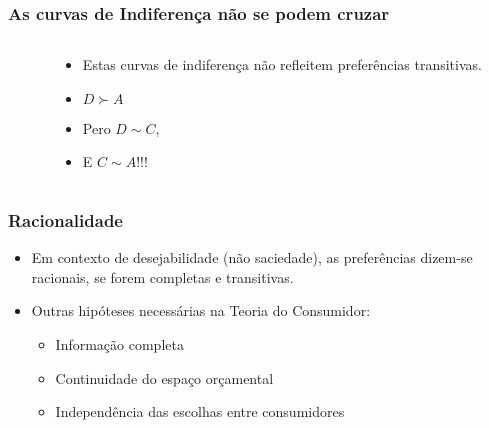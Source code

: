\begin{frame}
	\frametitle{As curvas de Indiferen\c ca n\~ao se podem cruzar}
	\begin{columns}
		\begin{column}{0.47\textwidth}
			\begin{center}
				\def\a{1/2}
				\def\inter{1.365}
			\end{center}
		\end{column}
		\begin{column}{0.47\textwidth}
			\begin{itemize}
				\item Estas curvas de indiferen\c ca n\~ao refleitem prefer\^encias transitivas.
				\item<2-> $D\succ A$
				\item<3-> Pero $D\sim C$,
				\item<4-> E $C\sim A$!!!
			\end{itemize}
		\end{column}
	\end{columns}
\end{frame}

\begin{frame}
	\frametitle{Racionalidade}
	\begin{itemize}
		\item<1-> Em contexto de desejabilidade (n\~ao saciedade), as prefer\^encias dizem-se racionais, se forem completas e transitivas.
		\item<2-> Outras hip\'oteses necess\'arias na Teoria do Consumidor:
		\begin{itemize}
			\item<3-> Informa\c c\~ao completa
			\item<4-> Continuidade do espa\c co or\c camental
			\item<5-> Independ\^encia das escolhas entre consumidores
		\end{itemize}
	\end{itemize}
\end{frame}


